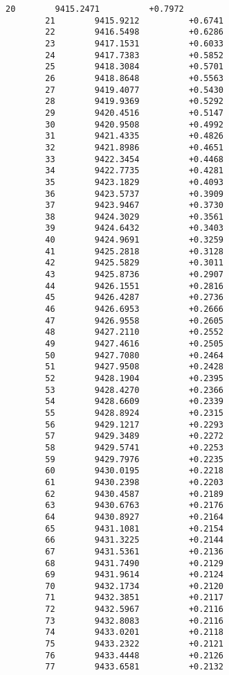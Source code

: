 \documentclass[11pt]{article}
\begin{document}
\begin{Verbatim}[commandchars=\\\{\}]
        20        9415.2471          +0.7972
        21        9415.9212          +0.6741
        22        9416.5498          +0.6286
        23        9417.1531          +0.6033
        24        9417.7383          +0.5852
        25        9418.3084          +0.5701
        26        9418.8648          +0.5563
        27        9419.4077          +0.5430
        28        9419.9369          +0.5292
        29        9420.4516          +0.5147
        30        9420.9508          +0.4992
        31        9421.4335          +0.4826
        32        9421.8986          +0.4651
        33        9422.3454          +0.4468
        34        9422.7735          +0.4281
        35        9423.1829          +0.4093
        36        9423.5737          +0.3909
        37        9423.9467          +0.3730
        38        9424.3029          +0.3561
        39        9424.6432          +0.3403
        40        9424.9691          +0.3259
        41        9425.2818          +0.3128
        42        9425.5829          +0.3011
        43        9425.8736          +0.2907
        44        9426.1551          +0.2816
        45        9426.4287          +0.2736
        46        9426.6953          +0.2666
        47        9426.9558          +0.2605
        48        9427.2110          +0.2552
        49        9427.4616          +0.2505
        50        9427.7080          +0.2464
        51        9427.9508          +0.2428
        52        9428.1904          +0.2395
        53        9428.4270          +0.2366
        54        9428.6609          +0.2339
        55        9428.8924          +0.2315
        56        9429.1217          +0.2293
        57        9429.3489          +0.2272
        58        9429.5741          +0.2253
        59        9429.7976          +0.2235
        60        9430.0195          +0.2218
        61        9430.2398          +0.2203
        62        9430.4587          +0.2189
        63        9430.6763          +0.2176
        64        9430.8927          +0.2164
        65        9431.1081          +0.2154
        66        9431.3225          +0.2144
        67        9431.5361          +0.2136
        68        9431.7490          +0.2129
        69        9431.9614          +0.2124
        70        9432.1734          +0.2120
        71        9432.3851          +0.2117
        72        9432.5967          +0.2116
        73        9432.8083          +0.2116
        74        9433.0201          +0.2118
        75        9433.2322          +0.2121
        76        9433.4448          +0.2126
        77        9433.6581          +0.2132

\end{Verbatim}
\end{document}

